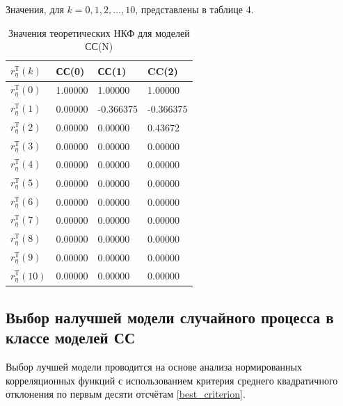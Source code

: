 \documentclass[12pt, fleqn]{article}
\begin{document}
{{{			Значения, для $k = 0,1,2,\dots,10$, представлены в таблице 4.
			\begin{table}[H]\label{tbl_ncf_ar}
				\centering
				\caption{Значения теоретических НКФ для моделей СС(N)}
				\begin{tabularx}{0.9\textwidth}{ |Y|Y|Y|Y| }
					\hline
					$r_{\eta}^{\text{Т}}(k)$  & СС(0) & СС(1) & CC(2) \\ \hline
					$r_{\eta}^{\text{Т}}(0)$  & 1.00000 & 1.00000 & 1.00000\\ \hline
					$r_{\eta}^{\text{Т}}(1)$  & 0.00000 & -0.366375 & -0.366375\\ \hline
					$r_{\eta}^{\text{Т}}(2)$  & 0.00000 & 0.00000 & 0.43672\\ \hline
					$r_{\eta}^{\text{Т}}(3)$  & 0.00000 & 0.00000  & 0.00000 \\ \hline
					$r_{\eta}^{\text{Т}}(4)$  & 0.00000 & 0.00000  & 0.00000 \\ \hline
					$r_{\eta}^{\text{Т}}(5)$  & 0.00000 & 0.00000  & 0.00000 \\ \hline
					$r_{\eta}^{\text{Т}}(6)$  & 0.00000 & 0.00000  & 0.00000 \\ \hline
					$r_{\eta}^{\text{Т}}(7)$  & 0.00000 & 0.00000  & 0.00000 \\ \hline
					$r_{\eta}^{\text{Т}}(8)$  & 0.00000 & 0.00000  & 0.00000 \\ \hline
					$r_{\eta}^{\text{Т}}(9)$  & 0.00000 & 0.00000  & 0.00000 \\ \hline
					$r_{\eta}^{\text{Т}}(10)$ & 0.00000 & 0.00000 & 0.00000 \\ \hline
				\end{tabularx}
			\end{table}
		}
		\subsection{Выбор налучшей модели случайного процесса в классе моделей СС} {
			Выбор лучшей модели проводится на основе анализа нормированных корреляционных функций с использованием критерия среднего квадратичного отклонения по первым десяти отсчётам \eqref{best_criterion}.
					
}}}
\end{document}
